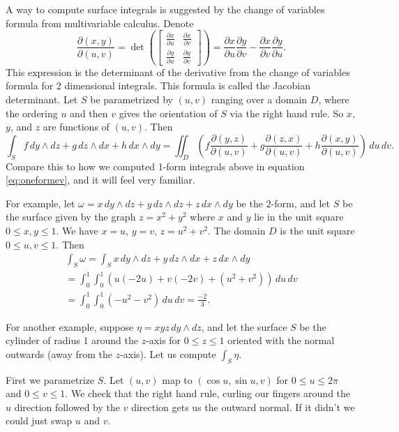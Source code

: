 \documentclass[12pt]{article}
\begin{document}
A way to compute surface integrals is suggested by the change of
variables formula from multivariable calculus.
Denote
$$
\frac{\partial (x,y)}{\partial (u,v)}
=
\det \left(
\begin{bmatrix}
\frac{\partial x}{\partial u}
&
\frac{\partial x}{\partial v}
\\
\frac{\partial y}{\partial u} 
&
\frac{\partial y}{\partial v}
\end{bmatrix}
\right)
=
\frac{\partial x}{\partial u}
\frac{\partial y}{\partial v}
-
\frac{\partial x}{\partial v}
\frac{\partial y}{\partial u} .
$$
This expression is the determinant of the derivative from the
change of variables formula for 2 dimensional integrals.
This formula is called the Jacobian determinant.
Let $S$ be parametrized by $(u,v)$ ranging over a domain $D$,
where the ordering $u$ and then $v$
gives the orientation of $S$ via the right hand rule.
So $x$, $y$, and $z$ are functions of $(u,v)$.
Then
\begin{equation*}
\int_S
f\, dy \wedge dz + 
g\, dz \wedge dx +
h\, dx \wedge dy
=
\iint_D
\left(
f 
\frac{\partial (y,z)}{\partial (u,v)}
+
g
\frac{\partial (z,x)}{\partial (u,v)}
+
h
\frac{\partial (x,y)}{\partial (u,v)}
\right)
\,
du\, dv .
\end{equation*}
Compare this to how we computed 1-form integrals above in
equation \eqref{eq:oneformev}, and it will feel very familiar.

For example, let $\omega = x \, dy \wedge dz + y \, dz \wedge dz
+ z \, dx \wedge dy$ be the
$2$-form, and let
$S$ be the surface given by the graph $z=x^2+y^2$ where $x$ and $y$ lie in
the unit square $0 \leq x,y \leq 1$.  We have $x=u$, $y=v$, $z=u^2+v^2$.
The domain $D$ is the unit square $0 \leq u,v \leq 1$.  Then
\begin{multline*}
\int_S \omega =
\int_S
x\, dy \wedge dz + 
y\, dz \wedge dx +
z\, dx \wedge dy
\\
=
\int_0^1 \int_0^1
\left(
u 
(-2u)
+
v
(-2v)
+
(u^2+v^2)
\right)
\,
du\, dv 
\\
=
\int_0^1 \int_0^1
(-u^2-v^2)
\,
du\, dv 
=
\frac{-2}{3} .
\end{multline*}

For another example, suppose $\eta = xyz \, dy \wedge dz$,
and let the surface $S$ be the cylinder of radius 1 around the $z$-axis
for $0 \leq z \leq 1$ oriented with the normal outwards (away from the
$z$-axis).   Let us compute $\int_S \eta$.

First we parametrize $S$.  Let $(u,v)$ map to $(\cos u, \sin u, v)$
for $0 \leq u \leq 2\pi$ and $0 \leq v \leq 1$.  We check that the
right hand rule, curling our fingers around the $u$ direction followed by
the $v$ direction gets us the outward normal.  If it didn't we could just
swap $u$ and $v$.
\end{document}
